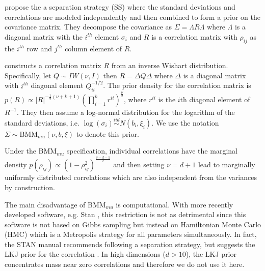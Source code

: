\documentclass[12pt]{article}
\begin{document}
\cite{barnard2000} propose the a separation strategy (SS) where the standard deviations and correlations are modeled independently and then combined to form a prior on the covariance matrix. They decompose the covariance as $\Sigma = \Lambda R \Lambda$  where $\Lambda$ is a diagonal matrix with the $i^{th}$ element $\sigma_{i}$ and $R$ is a correlation matrix with $\rho_{ij}$ as the $i^{th}$ row and $j^{th}$ column element of $R$. 

\cite{barnard2000} constructs a correlation matrix $R$ from an inverse Wishart distribution. Specifically, let $Q\sim IW(\nu, I )$ then $R = \Delta Q \Delta$ where $\Delta$ is a diagonal matrix with $i^{th}$ diagonal element $Q_{ii}^{-1/2}$. The prior density for the correlation matrix is $p(R) \propto |R|^{-\frac{1}{2}(\nu+k+1) }  (\prod_{i=1}^k r^{ii}) ^{\frac{\nu}{2}}$, where $r^{ii}$ is the $i$th diagonal element of $R^{-1}$. They then assume a log-normal distribution for the logarithm of the standard deviations, i.e. $\log(\sigma_i) \stackrel{iid} \sim N(b_i, \xi_i)$.  We use the notation $\Sigma \sim \mbox{BMM}_{mu}(\nu,b,\xi)$ to denote this prior.

Under the BMM$_{mu}$ specification, individual correlations have the marginal density $p(\rho_{ij}) \propto (1-\rho_{ij}^2)^{\frac{\nu-d-1}{2}}$ and then setting $\nu=d+1$ lead to marginally uniformly distributed correlations which are also independent from the variances by construction. 

The main disadvantage of BMM$_{mu}$ is computational. %
With more recently developed software, e.g. Stan \citep{stan2014}, this restriction is not as  detrimental since this software is not based on Gibbs sampling but instead on Hamiltonian Monte Carlo (HMC) which is a Metropolis strategy for all parameters simultaneously.  In fact, the STAN manual \citep{stanmanual2014} recommends following a separation strategy, but suggests the LKJ prior for the correlation \cite{lewandowski2009generating}. In high dimensions ($d>10$), the LKJ prior concentrates mass near zero correlations and therefore we do not use it here.

\end{document}
